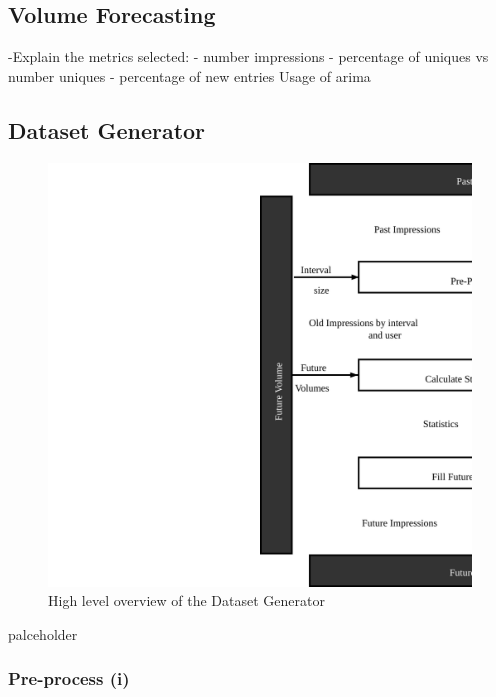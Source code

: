 \subsection{Volume Forecasting}

-Explain the metrics selected:
 - number impressions
 - percentage of uniques vs number  uniques
 - percentage of new entries
Usage of arima

\subsection{Dataset Generator}

\begin{figure}[h] \begin{center} \leavevmode
\includegraphics[]{high_level_file_gen} \caption{ High level overview
of the Dataset Generator } \label{fig:highlevel_arch_file_gen} \end{center} \end{figure}

palceholder

\subsubsection{Pre-process (i)}

